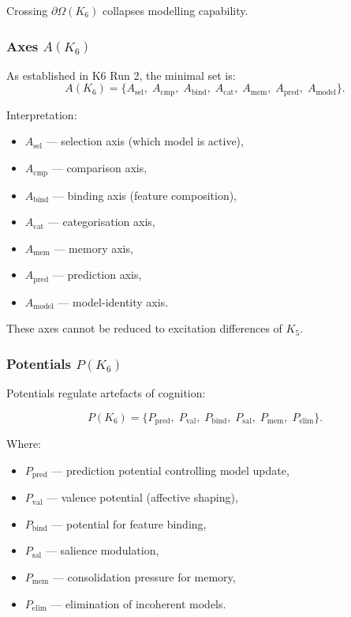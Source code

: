 Crossing $\partial \Omega(K_6)$ collapses modelling capability.

\subsubsection{Axes \texorpdfstring{$A(K_6)$}{A(K_6)}}

As established in K6 Run 2, the minimal set is:
\[
A(K_6) = \{
A_{\mathrm{sel}},\;
A_{\mathrm{cmp}},\;
A_{\mathrm{bind}},\;
A_{\mathrm{cat}},\;
A_{\mathrm{mem}},\;
A_{\mathrm{pred}},\;
A_{\mathrm{model}}
\}.
\]

Interpretation:
\begin{itemize}
    \item $A_{\mathrm{sel}}$ — selection axis (which model is active),
    \item $A_{\mathrm{cmp}}$ — comparison axis,
    \item $A_{\mathrm{bind}}$ — binding axis (feature composition),
    \item $A_{\mathrm{cat}}$ — categorisation axis,
    \item $A_{\mathrm{mem}}$ — memory axis,
    \item $A_{\mathrm{pred}}$ — prediction axis,
    \item $A_{\mathrm{model}}$ — model-identity axis.
\end{itemize}

These axes cannot be reduced to excitation differences of $K_5$.

\subsubsection{Potentials \texorpdfstring{$P(K_6)$}{P(K_6)}}

Potentials regulate artefacts of cognition:

\[
P(K_6)=
\{
P_{\mathrm{pred}},\;
P_{\mathrm{val}},\;
P_{\mathrm{bind}},\;
P_{\mathrm{sal}},\;
P_{\mathrm{mem}},\;
P_{\mathrm{elim}}
\}.
\]

Where:
\begin{itemize}
    \item $P_{\mathrm{pred}}$ — prediction potential controlling model update,
    \item $P_{\mathrm{val}}$ — valence potential (affective shaping),
    \item $P_{\mathrm{bind}}$ — potential for feature binding,
    \item $P_{\mathrm{sal}}$ — salience modulation,
    \item $P_{\mathrm{mem}}$ — consolidation pressure for memory,
    \item $P_{\mathrm{elim}}$ — elimination of incoherent models.
\end{itemize}

